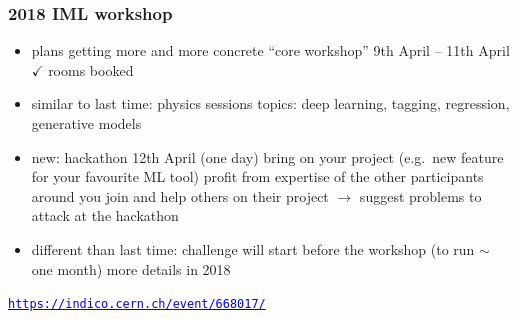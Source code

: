 \documentclass[table,xcolor=dvipsnames,professionalfonts]{beamer}
\newcommand{\openref}[1]{\href{#1}{\footnotesize{\textcolor{blue}{\texttt{#1}}}}}
\begin{document}
\begin{frame}
  \frametitle{2018 IML workshop}
  \begin{itemize}
      \item plans getting more and more concrete
        \newline ``core workshop'' 9th April -- 11th April
        \newline $\checkmark$ rooms booked
      \item similar to last time: physics sessions
        \newline topics: deep learning, tagging, regression, generative models
      \item new: hackathon 12th April (one day)
        \newline bring on your project (e.g.\ new feature for your favourite ML tool)
        \newline profit from expertise of the other participants around you
        \newline join and help others on their project
        \newline $\rightarrow$ suggest problems to attack at the hackathon
      \item different than last time: challenge
        \newline will start before the workshop (to run $\sim$ one month)
        \newline more details in 2018
  \end{itemize}
  \openref{https://indico.cern.ch/event/668017/}
\end{frame}
\end{document}

